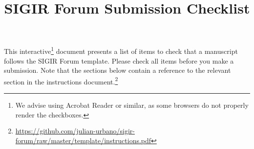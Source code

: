 \documentclass[news]{sigirforum}
\begin{document}
\title{\vspace{-0.2cm}SIGIR Forum Submission Checklist}

\maketitle 
\sloppy
\vspace{-1.6cm}
\noindent This interactive\footnote{We advise using Acrobat Reader or similar, as some browsers do not properly render the checkboxes.} document presents a list of items to check that a manuscript follows the SIGIR Forum template. Please check all items before you make a submission. Note that the sections below contain a reference to the relevant section in the instructions document.\footnote{\url{https://github.com/julian-urbano/sigir-forum/raw/master/template/instructions.pdf}}
\end{document}
